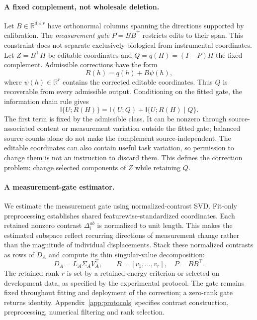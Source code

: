 \documentclass{article}
\theoremstyle{plain}
\theoremstyle{definition}
\newcommand{\R}{\mathbb R}
\newcommand{\I}{\mathsf I}
\begin{document}
\paragraph{A fixed complement, not wholesale deletion.}
Let $B\in\R^{d\times r}$ have orthonormal columns spanning the directions
supported by calibration. The \emph{measurement gate} $P=BB^\top$ restricts
edits to their span. This constraint does not separate exclusively biological
from instrumental coordinates. Let $Z=B^\top H$ be editable coordinates and
$Q=q(H)=(I-P)H$ the fixed complement. Admissible corrections have the form
\begin{equation}
 R(h)=q(h)+B\psi(h),
 \label{eq:admissible}
\end{equation}
where $\psi(h)\in\R^r$ contains the corrected editable coordinates.
Thus $Q$ is recoverable from every admissible output. Conditioning on the
fitted gate, the information chain rule gives
\begin{equation}
 \I\{U;R(H)\}=\I(U;Q)+\I\{U;R(H)\mid Q\}.
 \label{eq:floor}
\end{equation}
The first term is fixed by the admissible class. It can be nonzero through
source-associated content or measurement variation outside the fitted gate;
balanced source counts alone do not make the complement source-independent.
The editable coordinates can also contain useful task variation, so permission
to change them is not an instruction to discard them. This defines the
correction problem: change selected components of $Z$ while retaining $Q$.

\paragraph{A measurement-gate estimator.}
We estimate the measurement gate using normalized-contrast SVD. Fit-only
preprocessing establishes shared featurewise-standardized coordinates.
Each retained nonzero contrast $\Delta_i^{ab}$ is normalized to unit length.
This makes the estimated subspace reflect recurring directions of measurement
change rather than the magnitude of individual displacements.
Stack these normalized contrasts as rows of $D_A$
and compute its thin singular-value decomposition:
\begin{equation}
 D_A=L_A\Sigma_AV_A^\top,\qquad
 B=[v_1,\ldots,v_r],\quad P=BB^\top.
 \label{eq:gate-estimate}
\end{equation}
The retained rank $r$ is set by a retained-energy criterion or selected on
development data, as specified by the experimental protocol. The gate remains
fixed throughout fitting and deployment of the correction; a zero-rank gate
returns identity. Appendix~\ref{app:protocols} specifies contrast construction,
preprocessing, numerical filtering and rank selection.
\end{document}
